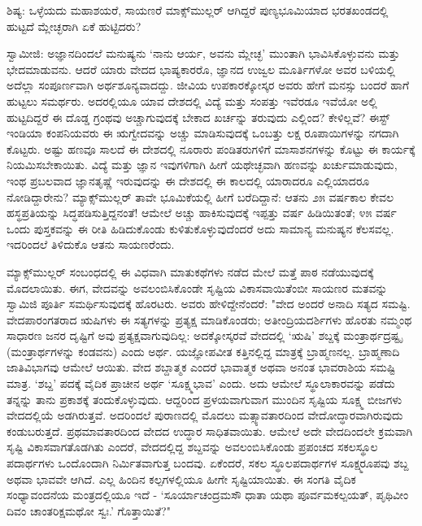 ಶಿಷ್ಯ: ಒಳ್ಳೆಯದು ಮಹಾಶಯರೆ, ಸಾಯಣರೆ ಮಾಕ್ಸ್‌ಮುಲ್ಲರ್ ಆಗಿದ್ದರೆ ಪುಣ್ಯಭೂಮಿಯಾದ ಭರತಖಂಡದಲ್ಲಿ ಹುಟ್ಟದೆ ಮ್ಲೇಚ್ಛರಾಗಿ ಏಕೆ ಹುಟ್ಟಿದರು?

ಸ್ವಾಮೀಜಿ: ಅಜ್ಞಾನದಿಂದಲೆ ಮನುಷ್ಯನು ‘ನಾನು ಆರ್ಯ, ಅವನು ಮ್ಲೇಚ್ಛ’ ಮುಂತಾಗಿ ಭಾವಿಸಿಕೊಳ್ಳುವನು ಮತ್ತು ಭೇದಮಾಡುವನು. ಆದರೆ ಯಾರು ವೇದದ ಭಾಷ್ಯಕಾರರೊ, ಜ್ಞಾನದ ಉಜ್ವಲ ಮೂರ್ತಿಗಳೋ ಅವರ ಬಳಿಯಲ್ಲಿ ಅದೆಲ್ಲಾ ಸಂಪೂರ್ಣವಾಗಿ ಅರ್ಥಶೂನ್ಯವಾದದ್ದು. ಜೀವಿಯ ಉಪಕಾರಕ್ಕೋಸ್ಕರ ಅವರು ಹೇಗೆ ಮನಸ್ಸು ಬಂದರೆ ಹಾಗೆ ಹುಟ್ಟಲು ಸಮರ್ಥರು. ಅದರಲ್ಲಿಯೂ ಯಾವ ದೇಶದಲ್ಲಿ ವಿದ್ಯೆ ಮತ್ತು ಸಂಪತ್ತು ಇವೆರಡೂ ಇವೆಯೋ ಅಲ್ಲಿ ಹುಟ್ಟದಿದ್ದರೆ ಈ ದೊಡ್ಡ ಗ್ರಂಥವು ಅಚ್ಚಾಗುವುದಕ್ಕೆ ಬೇಕಾದ ಖರ್ಚನ್ನು ತರುವುದು ಎಲ್ಲಿಂದ? ಕೇಳಿಲ್ಲವೆ? ಈಸ್ಟ್ ಇಂಡಿಯಾ ಕಂಪನಿಯವರು ಈ ಋಗ್ವೇದವನ್ನು ಅಚ್ಚು ಮಾಡಿಸುವುದಕ್ಕೆ ಒಂಬತ್ತು ಲಕ್ಷ ರೂಪಾಯಿಗಳನ್ನು ನಗದಾಗಿ ಕೊಟ್ಟರು. ಅಷ್ಟು ಹಣವೂ ಸಾಲದೆ ಈ ದೇಶದಲ್ಲಿ ನೂರಾರು ಪಂಡಿತರುಗಳಿಗೆ ಮಾಸಾಶನಗಳನ್ನು ಕೊಟ್ಟು ಈ ಕಾರ್ಯಕ್ಕೆ ನಿಯಮಿಸಬೇಕಾಯಿತು. ವಿದ್ಯೆ ಮತ್ತು ಜ್ಞಾನ ಇವುಗಳಿಗಾಗಿ ಹೀಗೆ ಯಥೇಚ್ಛವಾಗಿ ಹಣವನ್ನು ಖರ್ಚುಮಾಡುವುದು, ಇಂಥ ಪ್ರಬಲವಾದ ಜ್ಞಾನತೃಷ್ಣೆ ಇರುವುದನ್ನು ಈ ದೇಶದಲ್ಲಿ ಈ ಕಾಲದಲ್ಲಿ ಯಾರಾದರೂ ಎಲ್ಲಿಯಾದರೂ ನೋಡಿದ್ದಾರೇನು? ಮ್ಯಾಕ್ಸ್‌ಮುಲ್ಲರ್ ತಾವೇ ಭೂಮಿಕೆಯಲ್ಲಿ ಹೀಗೆ ಬರೆದಿದ್ದಾನೆ: ಆತನು ೨೫ ವರ್ಷಕಾಲ ಕೇವಲ ಹಸ್ಥಪ್ರತಿಯನ್ನು ಸಿದ್ಧಪಡಿಸುತ್ತಿದ್ದನಂತೆ! ಆಮೇಲೆ ಅಚ್ಚು ಹಾಕಿಸುವುದಕ್ಕೆ ಇಪ್ಪತ್ತು ವರ್ಷ ಹಿಡಿಯಿತಂತೆ; ೪೫ ವರ್ಷ ಒಂದು ಪುಸ್ತಕವನ್ನು ಈ ರೀತಿ ಹಿಡಿದುಕೊಂಡು ಕುಳಿತುಕೊಳ್ಳುವುದೆಂದರೆ ಅದು ಸಾಮಾನ್ಯ ಮನುಷ್ಯನ ಕೆಲಸವಲ್ಲ. ಇದರಿಂದಲೆ ತಿಳಿದುಕೊ ಆತನು ಸಾಯಣರೆಂದು.

ಮ್ಯಾಕ್ಸ್‌ಮುಲ್ಲರ್ ಸಂಬಂಧದಲ್ಲಿ ಈ ವಿಧವಾಗಿ ಮಾತುಕಥೆಗಳು ನಡೆದ ಮೇಲೆ ಮತ್ತೆ ಪಾಠ ನಡೆಯುವುದಕ್ಕೆ ಮೊದಲಾಯಿತು. ಈಗ, ವೇದವನ್ನು ಅವಲಂಬಿಸಿಕೊಂಡೇ ಸೃಷ್ಟಿಯ ವಿಕಾಸವಾಯಿತೆಂಬೀ ಸಾಯಣರ ಮತವನ್ನು ಸ್ವಾಮಿಜಿ ಪೂರ್ತಿ ಸಮರ್ಥಿಸುವುದಕ್ಕೆ ಹೊರಟರು. ಅವರು ಹೇಳಿದ್ದೇನೆಂದರೆ: "ವೇದ ಅಂದರೆ ಅನಾದಿ ಸತ್ಯದ ಸಮಷ್ಟಿ. ವೇದಪಾರಂಗತರಾದ ಋಷಿಗಳು ಈ ಸತ್ಯಗಳನ್ನು ಪ್ರತ್ಯಕ್ಷ ಮಾಡಿಕೊಂಡರು; ಅತೀಂದ್ರಿಯದರ್ಶಿಗಳು ಹೊರತು ನಮ್ಮಂಥ ಸಾಧಾರಣ ಜನರ ದೃಷ್ಟಿಗೆ ಅವು ಪ್ರತ್ಯಕ್ಷವಾಗುವುದಿಲ್ಲ: ಅದಕ್ಕೋಸ್ಕರವೆ ವೇದದಲ್ಲಿ ‘ಋಷಿ’ ಶಬ್ದಕ್ಕೆ ಮಂತ್ರಾರ್ಥದ್ರಷ್ಟೃ (ಮಂತ್ರಾರ್ಥಗಳನ್ನು ಕಂಡವನು) ಎಂದು ಅರ್ಥ. ಯಜ್ಞೋಪವೀತ ಕತ್ತಿನಲ್ಲಿದ್ದ ಮಾತ್ರಕ್ಕೆ ಬ್ರಾಹ್ಮಣನಲ್ಲ. ಬ್ರಾಹ್ಮಣಾದಿ ಜಾತಿವಿಭಾಗವು ಆಮೇಲೆ ಆಯಿತು. ವೇದ ಶಬ್ದಾತ್ಮಕ ಎಂದರೆ ಭಾವಾತ್ಮಕ ಅಥವಾ ಅನಂತ ಭಾವರಾಶಿಯ ಸಮಷ್ಟಿ ಮಾತ್ರ. ‘ಶಬ್ದ’ ಪದಕ್ಕೆ ವೈದಿಕ ಪ್ರಾಚೀನ ಅರ್ಥ ‘ಸೂಕ್ಷ್ಮಭಾವ’ ಎಂದು. ಅದು ಆಮೇಲೆ ಸ್ಥೂಲಾಕಾರವನ್ನು ಪಡೆದು ತನ್ನನ್ನು ತಾನು ಪ್ರಕಾಶಕ್ಕೆ ತಂದುಕೊಳ್ಳುವುದು. ಆದ್ದರಿಂದ ಪ್ರಳಯವಾಗುವಾಗ ಮುಂದಿನ ಸೃಷ್ಟಿಯ ಸೂಕ್ಷ್ಮ ಬೀಜಗಳು ವೇದದಲ್ಲಿಯೆ ಅಡಗಿರುತ್ತವೆ. ಅದರಿಂದಲೆ ಪುರಾಣದಲ್ಲಿ ಮೊದಲು ಮತ್ಸ್ಯಾವತಾರದಿಂದ ವೇದೋದ್ಧಾರವಾಗಿರುವುದು ಕಂಡುಬರುತ್ತದೆ. ಪ್ರಥಮಾವತಾರದಿಂದ ವೇದದ ಉದ್ಧಾರ ಸಾಧಿತವಾಯಿತು. ಆಮೇಲೆ ಅದೇ ವೇದದಿಂದಲೇ ಕ್ರಮವಾಗಿ ಸೃಷ್ಟಿ ವಿಕಾಸವಾಗತೊಡಗಿತು ಎಂದರೆ, ವೇದದಲ್ಲಿದ್ದ ಶಬ್ದವನ್ನು ಅವಲಂಬಿಸಿಕೊಂಡು ಪ್ರಪಂಚದ ಸಕಲಸ್ಥೂಲ ಪದಾರ್ಥಗಳು ಒಂದೊಂದಾಗಿ ನಿರ್ಮಿತವಾಗುತ್ತ ಬಂದವು. ಏಕೆಂದರೆ, ಸಕಲ ಸ್ಥೂಲಪದಾರ್ಥಗಳ ಸೂಕ್ಷ್ಮರೂಪವು ಶಬ್ದ ಅಥವಾ ಭಾವವೇ ಆಗಿದೆ. ಎಲ್ಲ ಹಿಂದಿನ ಕಲ್ಪಗಳಲ್ಲಿಯೂ ಹೀಗೇ ಸೃಷ್ಟಿಯಾಯಿತು. ಈ ಸಂಗತಿ ವೈದಿಕ ಸಂಧ್ಯಾವಂದನೆಯ ಮಂತ್ರದಲ್ಲಿಯೂ ಇದೆ - ‘ಸೂರ್ಯಾಚಂದ್ರಮಸೌ ಧಾತಾ ಯಥಾ ಪೂರ್ವಮಕಲ್ಪಯತ್, ಪೃಥಿವೀಂ ದಿವಂ ಚಾಂತರಿಕ್ಷಮಥೋ ಸ್ವಃ.’ ಗೊತ್ತಾಯಿತೆ?"

